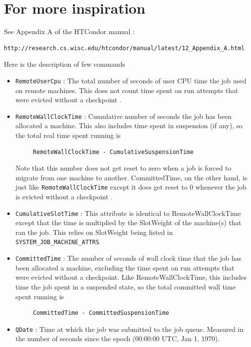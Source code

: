 \documentclass{article}
\begin{document}
\section{For more inspiration}
See Appendix A of the HTCondor manual \cite{HTcondor_Appendix_11, HTcondor_Appendix_12}:
\begin{verbatim}
http://research.cs.wisc.edu/htcondor/manual/latest/12_Appendix_A.html
\end{verbatim}
Here is the description of few commands
\begin{itemize}
\item \verb+RemoteUserCpu+ : The total number of seconds of user CPU time the job used on remote machines. This does not count time spent on run attempts that were evicted without a checkpoint \cite{HTcondor_Appendix_12}.
\item \verb+RemoteWallClockTime+ : Cumulative number of seconds the job has been allocated a machine. This also includes time spent in suspension (if any), so the total real time spent running is  \cite{HTcondor_Appendix_12}
\scriptsize
\begin{verbatim}
     RemoteWallClockTime - CumulativeSuspensionTime
\end{verbatim}
\normalsize
Note that this number does not get reset to zero when a job is forced to migrate from one machine to another. CommittedTime, on the other hand, is just like \verb+RemoteWallClockTime+ except it does get reset to $0$ whenever the job is evicted without a checkpoint  \cite{HTcondor_Appendix_12}.
\item \verb+CumulativeSlotTime+ :  This attribute is identical to RemoteWallClockTime except that the time is multiplied by the SlotWeight of the machine(s) that ran the job. This relies on SlotWeight being listed in \verb+SYSTEM_JOB_MACHINE_ATTRS+  \cite{HTcondor_Appendix_12} 
\item \verb+CommittedTime+ : The number of seconds of wall clock time that the job has been allocated a machine, excluding the time spent on run attempts that were evicted without a checkpoint. Like RemoteWallClockTime, this includes time the job spent in a suspended state, so the total committed wall time spent running is \cite{HTcondor_Appendix_12}
\scriptsize
\begin{verbatim}
     CommittedTime - CommittedSuspensionTime
\end{verbatim}
\normalsize
\item \verb+QDate+ : Time at which the job was submitted to the job queue. Measured in the number of seconds since the epoch (00:00:00 UTC, Jan 1, 1970).

\end{itemize}
\end{document}
